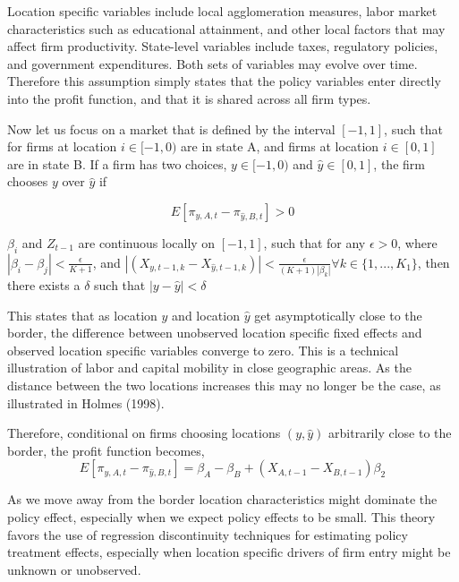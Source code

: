 Location specific variables include local agglomeration measures, labor market characteristics such as educational attainment, and other local factors that may affect firm productivity. State-level variables include taxes, regulatory policies, and government expenditures. Both sets of variables may evolve over time. Therefore this assumption simply states that the policy variables enter directly into the profit function, and that it is shared across all firm types. 

Now let us focus on a market that is defined by the interval $[-1,1]$, such that for firms at location $i \in [-1,0)$ are in state A, and firms at location $i \in [0,1]$ are in state B. If a firm has two choices,  $y \in [-1,0)$ and $\hat y \in [0,1]$, the firm chooses $y$ over $\hat y$ if 

\begin{equation}\label{diff}
E[\pi_{y,A,t}-\pi_{\hat y,B,t}] > 0
\end{equation}

\begin{assumption}\label{cont}
$\beta_{i}$ and $Z_{t-1}$ are continuous locally on $[-1,1]$, such that for any $\epsilon > 0$, where  $|\beta_{i}-\beta_{j}| < \frac{\epsilon}{K+1}$, and $|(X_{y,t-1,k}-X_{\hat y,t-1,k})| < \frac{\epsilon}{(K+1)|\beta_{k}|} \forall k \in \{1,...,K_{1}\}$, then there exists a $\delta$ such that $|y - \hat y| < \delta$
\end{assumption}

This states that as location $y$ and location $\hat y$  get asymptotically close to the border, the difference between unobserved location specific fixed effects and observed location specific variables converge to zero. This is a technical illustration of labor and capital mobility in close geographic areas. As the distance between the two locations increases this may no longer be the case, as illustrated in Holmes (1998). 

Therefore, conditional on firms choosing locations $(y,\hat y)$ arbitrarily close to the border, the profit function becomes,
\begin{equation}\label{prof}
E[\pi_{y,A,t}-\pi_{\hat y, B, t}] =  \beta_{A}-\beta_{B}+(X_{A,t-1}-X_{B,t-1})\beta_{2}
\end{equation}

As we move away from the border location characteristics might dominate the policy effect, especially when we expect policy effects to be small. This theory favors the use of regression discontinuity techniques for estimating policy treatment effects, especially when location specific drivers of firm entry might be unknown or unobserved.